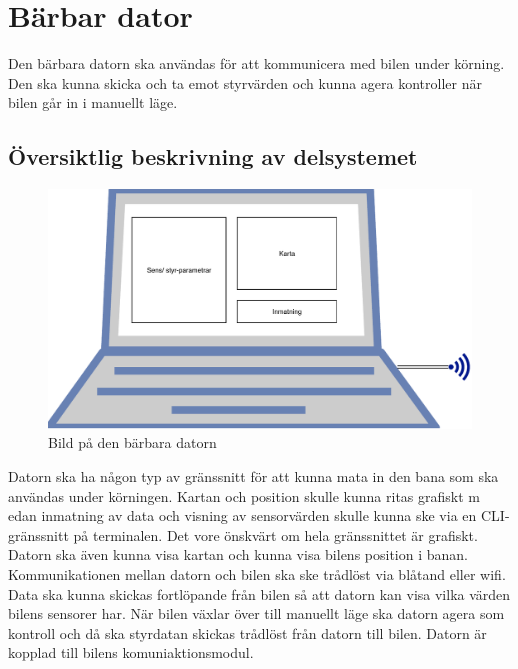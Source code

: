 \documentclass[systemskiss/skiss.tex]{subfiles}
\begin{document}
\section{Bärbar dator}
Den bärbara datorn ska användas för att kommunicera med bilen under körning. Den ska kunna skicka och ta emot styrvärden och kunna agera kontroller när bilen går in i manuellt läge.
\subsection{Översiktlig beskrivning av delsystemet}
\begin{figure}[h]
    \centering
    \includegraphics[width=0.6\linewidth]{systemskiss/figures/laptop.pdf}
    \caption{Bild på den bärbara datorn}
    \label{fig:laptopskiss}
\end{figure}
\noindent
Datorn ska ha någon typ av gränssnitt för att kunna mata in den bana som ska
användas under körningen. Kartan och position skulle kunna ritas grafiskt m
edan inmatning av data och visning av sensorvärden skulle kunna ske via en
CLI-gränssnitt på terminalen. Det vore önskvärt om hela gränssnittet är
grafiskt. Datorn ska även kunna visa kartan och kunna visa bilens position i banan. Kommunikationen mellan datorn och bilen ska ske trådlöst via blåtand eller wifi. Data ska kunna skickas fortlöpande från bilen så att datorn kan visa vilka värden bilens sensorer har. När bilen växlar över till manuellt läge ska datorn agera som kontroll och då ska styrdatan skickas trådlöst från datorn till bilen. Datorn är kopplad till bilens komuniaktionsmodul.
\end{document}
